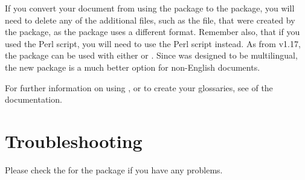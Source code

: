 \documentclass{nlctdoc}
\begin{document}
If you convert your document from using the  package
to the  package, you will need to delete any of
the additional files, such as the  file, that were
created by the  package, as the 
package uses a different format. 
Remember also, that if you used the  Perl script,
you will need to use the  Perl script 
instead. As from v1.17, the  package can be
used with either  or . Since
 was designed to be multilingual, the 
new  package is a much better option for 
non-English documents.

For further information on using ,
 or  to create your glossaries, see
of the  documentation.

\section{Troubleshooting}

Please check the  
for the  package if you have any
problems.

\PrintIndex
\end{document}

